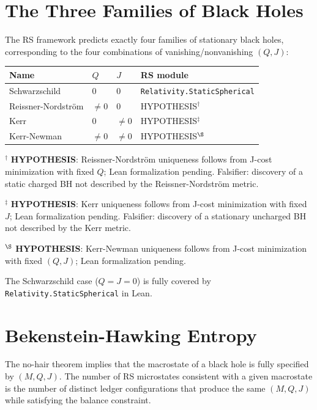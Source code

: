 \documentclass[12pt,a4paper]{article}
\theoremstyle{definition}
\theoremstyle{remark}
\begin{document}
\section{The Three Families of Black Holes}
\label{sec:families}

The RS framework predicts exactly four families of stationary black
holes, corresponding to the four combinations of vanishing/nonvanishing
$(Q, J)$:

\begin{center}
\begin{tabular}{llll}
\toprule
Name & $Q$ & $J$ & RS module \\
\midrule
Schwarzschild & 0 & 0 & \texttt{Relativity.StaticSpherical} \\
Reissner-Nordstr\"{o}m & $\neq 0$ & 0 & HYPOTHESIS$^\dagger$ \\
Kerr & 0 & $\neq 0$ & HYPOTHESIS$^\ddagger$ \\
Kerr-Newman & $\neq 0$ & $\neq 0$ & HYPOTHESIS$^\S$ \\
\bottomrule
\end{tabular}
\end{center}

$^\dagger$ \textbf{HYPOTHESIS}: Reissner-Nordstr\"{o}m uniqueness follows
from J-cost minimization with fixed $Q$; Lean formalization pending.
Falsifier: discovery of a static charged BH not described by the
Reissner-Nordstr\"{o}m metric.

$^\ddagger$ \textbf{HYPOTHESIS}: Kerr uniqueness follows from J-cost
minimization with fixed $J$; Lean formalization pending.  Falsifier:
discovery of a stationary uncharged BH not described by the Kerr metric.

$^\S$ \textbf{HYPOTHESIS}: Kerr-Newman uniqueness follows from J-cost
minimization with fixed $(Q, J)$; Lean formalization pending.

The Schwarzschild case ($Q = J = 0$) is fully covered by
\texttt{Relativity.StaticSpherical} in Lean.

\section{Bekenstein-Hawking Entropy}
\label{sec:entropy}

The no-hair theorem implies that the macrostate of a black hole is
fully specified by $(M, Q, J)$.  The number of RS microstates
consistent with a given macrostate is the number of distinct ledger
configurations that produce the same $(M, Q, J)$ while satisfying the
balance constraint.
\end{document}
